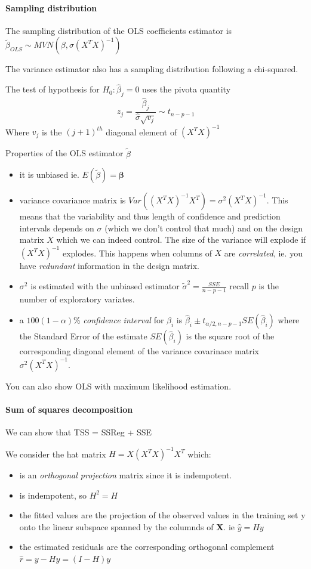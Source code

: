 \documentclass{article}
\begin{document}
\paragraph{Sampling distribution}
The sampling distribution of the OLS coefficients estimator is $\tilde \beta_{OLS} \sim MVN(\beta, \sigma (X^TX)^{-1})$ 

The variance estimator also has a sampling distribution following a chi-squared. 

The test of hypothesis for $H_0: \hat \beta_j = 0$ uses the pivota quantity 
\[z_j = \frac{\hat \beta_j}{\hat \sigma \sqrt{v_j}} \sim t_{n-p-1}\]
Where $v_j$ is the $(j+1)^{th}$ diagonal element of $(X^TX)^{-1}$

Properties of the OLS estimator $\tilde{\beta}$ 
\begin{itemize}
\item it is unbiased ie. $E(\tilde{\beta}) = \bm \beta$
\item variance covariance matrix is $Var((X^T X)^{-1}X^T) = \sigma^2 (X^TX)^{-1}$. This means that the variability and thus length of confidence and prediction intervals depends on $\sigma$ (which we don't control that much) and on the design matrix $X$ which we can indeed control. The size of the variance will explode if $(X^TX)^{-1}$ explodes. This happens when columns of $X$ are \textit{correlated}, ie. you have \textit{redundant} information in the design matrix. 
\item $\sigma^2$ is estimated with the unbiased estimator $\tilde \sigma^2 = \frac{SSE}{n-p-1}$ recall $p$ is the number of exploratory variates. 
\item a $100(1-\alpha)$\% \textit{confidence interval} for $\beta_i$ is $\hat \beta_i \pm t_{\alpha/2, n-p-1}SE(\hat \beta_i)$ where the Standard Error of the estimate $SE(\hat \beta_i)$ is the square root of the corresponding diagonal element of the variance covarinace matrix  $\sigma^2 (X^TX)^{-1}$.
\end{itemize}

You can also show OLS with maximum likelihood estimation. 

\paragraph{Sum of squares decomposition}
We can show that TSS = SSReg + SSE



We consider the hat matrix $H = X(X^T X)^{-1} X^T$ which:
\begin{itemize}
\item is an \textit{orthogonal projection} matrix since it is indempotent.
\item is indempotent, so  $H^2 = H$
\item the fitted values are the projection of the observed values in the training set y onto the linear subspace spanned by the columnds of \textbf{X}. ie $\hat y = H y$
\item the estimated residuals are the corresponding orthogonal complement $\hat r  = y - Hy = (I-H)y$
\end{itemize}
\end{document}
